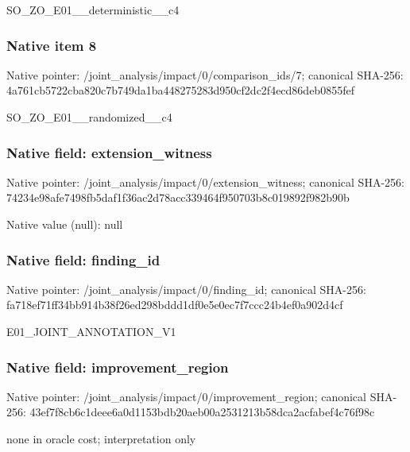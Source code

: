 \documentclass[10pt,a4paper]{article}
\begin{document}
\begingroup\raggedright\sloppy SO\_\allowbreak{}ZO\_\allowbreak{}E01\_\allowbreak{}\_\allowbreak{}deterministic\_\allowbreak{}\_\allowbreak{}c4\par\endgroup

\subsubsection{Native item 8}
Native pointer: /joint\_\allowbreak{}analysis/impact/0/comparison\_\allowbreak{}ids/7; canonical SHA-256: 4a761cb5722cba820c7b749da1ba448275283d950cf2dc2f4ecd86deb0855fef

\begingroup\raggedright\sloppy SO\_\allowbreak{}ZO\_\allowbreak{}E01\_\allowbreak{}\_\allowbreak{}randomized\_\allowbreak{}\_\allowbreak{}c4\par\endgroup

\subsubsection{Native field: extension\_\allowbreak{}witness}
Native pointer: /joint\_\allowbreak{}analysis/impact/0/extension\_\allowbreak{}witness; canonical SHA-256: 74234e98afe7498fb5daf1f36ac2d78acc339464f950703b8c019892f982b90b

Native value (null): null

\subsubsection{Native field: finding\_\allowbreak{}id}
Native pointer: /joint\_\allowbreak{}analysis/impact/0/finding\_\allowbreak{}id; canonical SHA-256: fa718ef71ff34bb914b38f26ed298bddd1df0e5e0ec7f7ccc24b4ef0a902d4cf

\begingroup\raggedright\sloppy E01\_\allowbreak{}JOINT\_\allowbreak{}ANNOTATION\_\allowbreak{}V1\par\endgroup

\subsubsection{Native field: improvement\_\allowbreak{}region}
Native pointer: /joint\_\allowbreak{}analysis/impact/0/improvement\_\allowbreak{}region; canonical SHA-256: 43ef7f8cb6c1deee6a0d1153bdb20aeb00a2531213b58dca2acfabef4c76f98c

\begingroup\raggedright\sloppy none in oracle cost;\allowbreak{} interpretation only\par\endgroup
\end{document}
